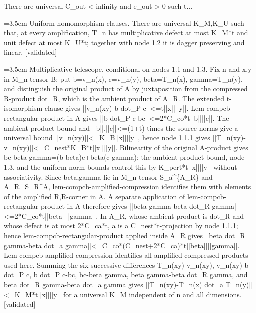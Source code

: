 \documentclass{article}
\newcommand{\step}[1]{\par\noindent\hangindent=3.5em\hangafter=1%
  \makebox[3.5em][l]{\textbf{#1.}}}
\newcommand{\steptag}[1]{\hfill{\small\textsf{[#1]}}}
\begin{document}
\begin{proofbox}{There are universal C\_out < infinity and e\_out > 0 such t...}
\step{1.4} Uniform homomorphism clauses. There are universal K\_M,K\_U such that, at every amplification, T\_n has multiplicative defect at most K\_M*t and unit defect at most K\_U*t; together with node 1.2 it is dagger preserving and linear. \steptag{validated} \\[6pt]
\step{1.4.1} Multiplicative telescope, conditional on nodes 1.1 and 1.3. Fix n and x,y in M\_n tensor B; put b=v\_n(x), c=v\_n(y), beta=T\_n(x), gamma=T\_n(y), and distinguish the original product of A by juxtaposition from the compressed R-product dot\_R, which is the ambient product of A\_R. The extended t-isomorphism clause gives ||v\_n(xy)-b dot\_P c||<=t||x||||y||. Lem-compcb-rectangular-product in A gives ||b dot\_P c-bc||<=2*C\_co*t||b||||c||. The ambient product bound and ||b||,||c||<=(1+t) times the source norms give a universal bound ||v\_n(xy)||<=K\_B||x||||y||, hence node 1.1.1 gives ||T\_n(xy)-v\_n(xy)||<=C\_nest*K\_B*t||x||||y||. Bilinearity of the original A-product gives bc-beta gamma=(b-beta)c+beta(c-gamma); the ambient product bound, node 1.3, and the uniform norm bounds control this by K\_pert*t||x||||y|| without associativity. Since beta,gamma lie in M\_n tensor S\_a\textasciicircum{}\{A\_R\} and A\_R=S\_R\textasciicircum{}A, lem-compcb-amplified-compression identifies them with elements of the amplified R,R-corner in A. A separate application of lem-compcb-rectangular-product in A therefore gives ||beta gamma-beta dot\_R gamma||<=2*C\_co*t||beta||||gamma||. In A\_R, whose ambient product is dot\_R and whose defect is at most 2*C\_ca*t, a is a C\_nest*t-projection by node 1.1.1; hence lem-compcb-rectangular-product applied inside A\_R gives ||beta dot\_R gamma-beta dot\_a gamma||<=C\_co*(C\_nest+2*C\_ca)*t||beta||||gamma||. Lem-compcb-amplified-compression identifies all amplified compressed products used here. Summing the six successive differences T\_n(xy)-v\_n(xy), v\_n(xy)-b dot\_P c, b dot\_P c-bc, bc-beta gamma, beta gamma-beta dot\_R gamma, and beta dot\_R gamma-beta dot\_a gamma gives ||T\_n(xy)-T\_n(x) dot\_a T\_n(y)||<=K\_M*t||x||||y|| for a universal K\_M independent of n and all dimensions. \steptag{validated} \\[6pt]

\end{proofbox}
\end{document}
